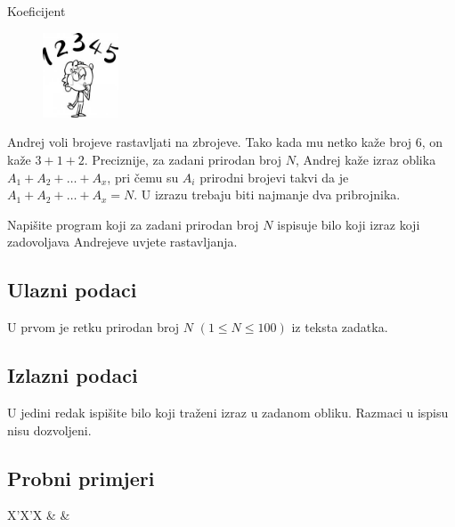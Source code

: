 \begin{statement}[
  problempoints=20,
  timelimit=1 sekunda,
  memorylimit=512 MiB,
]{Koeficijent}

\setlength\intextsep{-0.1cm}
\begin{figure}
\centering
\includegraphics[width=0.2\textwidth]{img/plenki.jpeg}
\end{figure}

Andrej voli brojeve rastavljati na zbrojeve. Tako kada mu netko kaže broj $6$,
on kaže $3+1+2$. Preciznije, za zadani prirodan broj $N$, Andrej kaže izraz
oblika $A_1+A_2+\dots+A_x$, pri čemu su $A_i$ prirodni brojevi takvi da je
$A_1+A_2+\dots+A_x=N$. U izrazu trebaju biti najmanje dva pribrojnika.

Napišite program koji za zadani prirodan broj $N$ ispisuje bilo koji izraz koji
zadovoljava Andrejeve uvjete rastavljanja.


\subsection*{Ulazni podaci}
U prvom je retku prirodan broj $N$ $(1 \le N \le 100)$ iz teksta zadatka.

\subsection*{Izlazni podaci}
U jedini redak ispišite bilo koji traženi izraz u zadanom obliku. Razmaci u
ispisu nisu dozvoljeni.


\subsection*{Probni primjeri}
\begin{tabularx}{\textwidth}{X'X'X}
 &
 &
\end{tabularx}


\end{statement}
